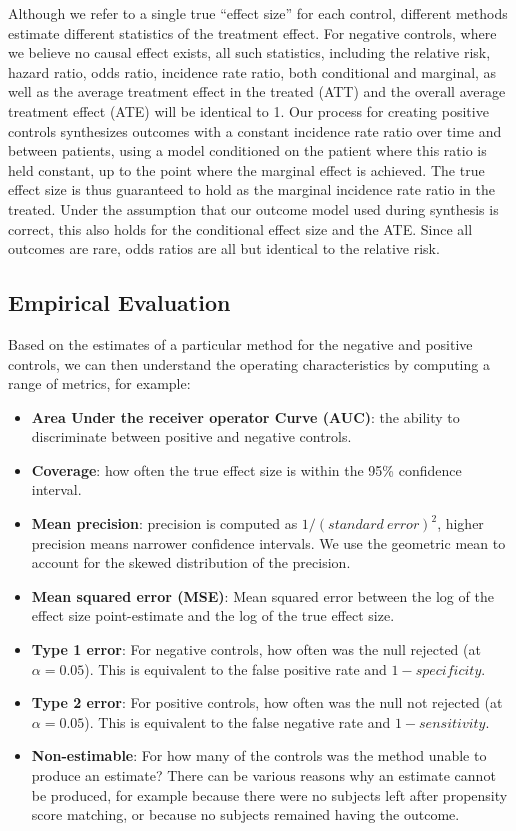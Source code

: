 \documentclass[11pt]{book}
\providecommand{\tightlist}{%
  \setlength{\itemsep}{0pt}\setlength{\parskip}{0pt}}
\theoremstyle{definition}
\theoremstyle{definition}
\theoremstyle{definition}
\theoremstyle{remark}
\begin{document}
Although we refer to a single true ``effect size'' for each control,
different methods estimate different statistics of the treatment effect.
For negative controls, where we believe no causal effect exists, all
such statistics, including the relative risk, hazard ratio, odds ratio,
incidence rate ratio, both conditional and marginal, as well as the
average treatment effect in the treated (ATT) and the overall average
treatment effect (ATE) will be identical to 1. Our process for creating
positive controls synthesizes outcomes with a constant incidence rate
ratio over time and between patients, using a model conditioned on the
patient where this ratio is held constant, up to the point where the
marginal effect is achieved. The true effect size is thus guaranteed to
hold as the marginal incidence rate ratio in the treated. Under the
assumption that our outcome model used during synthesis is correct, this
also holds for the conditional effect size and the ATE. Since all
outcomes are rare, odds ratios are all but identical to the relative
risk.

\subsection{Empirical Evaluation}\label{metrics}


Based on the estimates of a particular method for the negative and
positive controls, we can then understand the operating characteristics
by computing a range of metrics, for example:

\begin{itemize}
\tightlist
\item
  \textbf{Area Under the receiver operator Curve (AUC)}: the ability to
  discriminate between positive and negative controls.
\item
  \textbf{Coverage}: how often the true effect size is within the 95\%
  confidence interval.
\item
  \textbf{Mean precision}: precision is computed as
  \(1/(standard\ error)^2\), higher precision means narrower confidence
  intervals. We use the geometric mean to account for the skewed
  distribution of the precision.
\item
  \textbf{Mean squared error (MSE)}: Mean squared error between the log
  of the effect size point-estimate and the log of the true effect size.
\item
  \textbf{Type 1 error}: For negative controls, how often was the null
  rejected (at \(\alpha = 0.05\)). This is equivalent to the false
  positive rate and \(1 - specificity\).
\item
  \textbf{Type 2 error}: For positive controls, how often was the null
  not rejected (at \(\alpha = 0.05\)). This is equivalent to the false
  negative rate and \(1 - sensitivity\).
\item
  \textbf{Non-estimable}: For how many of the controls was the method
  unable to produce an estimate? There can be various reasons why an
  estimate cannot be produced, for example because there were no
  subjects left after propensity score matching, or because no subjects
  remained having the outcome.
\end{itemize}
\end{document}
